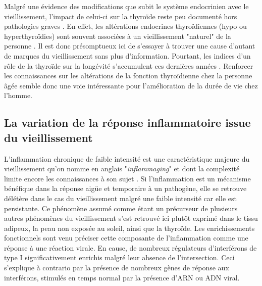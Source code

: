 Malgré une évidence des modifications que subit le système endocrinien avec le vieillissement, l'impact de celui-ci sur la thyroïde reste peu documenté hors pathologies graves . En effet, les altérations endocrines thyroïdiennes (hypo ou hyperthyroïdies) sont souvent associées à un vieillissement "naturel" de la personne . Il est donc présomptueux ici de s'essayer à trouver une cause d'autant de marques du vieillissement sans plus d'information. Pourtant, les indices d'un rôle de la thyroïde sur la longévité s'accumulent ces dernières années . Renforcer les connaissances sur les altérations de la fonction thyroïdienne chez la personne âgée semble donc une voie intéressante pour l'amélioration de la durée de vie chez l'homme.


\subsection{La variation de la réponse inflammatoire issue du vieillissement}

L'inflammation chronique de faible intensité est une caractéristique majeure du vieillissement qu'on nomme en anglais "\textit{inflammaging}" et dont la complexité limite encore les connaissances à son sujet . Si l'inflammation est un mécanisme bénéfique dans la réponse aigüe et temporaire à un pathogène, elle se retrouve délétère dans le cas du vieillissement malgré une faible intensité car elle est persistante. Ce phénomène assumé comme étant un précurseur de plusieurs autres phénomènes du vieillissement  s'est retrouvé ici plutôt exprimé dans le tissu adipeux, la peau non exposée au soleil, ainsi que la thyroïde. Les enrichissements fonctionnels sont venu préciser cette composante de l'inflammation comme une réponse à une réaction virale. En cause, de nombreux régulateurs d'interférons de type I significativement enrichis malgré leur absence de l'intersection. Ceci s'explique à contrario par la présence de nombreux gènes de réponse aux interférons, stimulés en temps normal par la présence d'ARN ou ADN viral.

